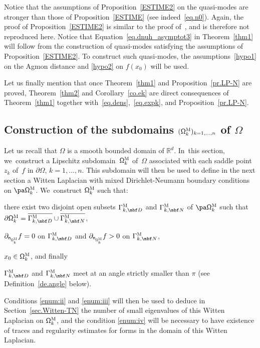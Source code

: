 Notice that the assumptions of Proposition~\ref{ESTIME2} on the
quasi-modes are stronger than those of Proposition~\ref{ESTIME} (see indeed~\eqref{eq.n0}).
Again, the proof of Proposition~\ref{ESTIME2} is similar to the proof
of~\cite[Prop.\,25]{DLLN}, and is therefore not reproduced
here. Notice that Equation~\eqref{eq.dnuh_asymptot3} in
Theorem~\ref{thm1} will follow from the construction of quasi-modes
satisfying the assumptions of Proposition~\ref{ESTIME2}. To construct such quasi-modes, the assumptions~\eqref{hypo1} on the Agmon distance and \eqref{hypo2} on $f(x_0)$ will be used.

Let us finally mention that once Theorem~\ref{thm1} and Proposition~\ref{pr.LP-N} are proved, Theorem~\ref{thm2} and Corollary~\ref{co.ek} are direct consequences of Theorem~\ref{thm1} together with~\eqref{eq.dens},~\eqref{eq.expk}, and Proposition~\ref{pr.LP-N}.

\subsection{Construction of the subdomains $(\mathsf
\Omega_k^{\textsc{M}})_{k=1,\ldots,n}$ of $\Omega$}\label{sec:omegakM}
Let us recall that $\Omega$ is a smooth bounded domain of $\mathbb R^d$. In~this section, we~construct a Lipschitz subdomain~$\mathsf \Omega_k^{\textsc{M}}$ of~$\Omega$ associated with each saddle point $z_k$ of~$f$ in $\partial \Omega$, $k=1,\ldots,n$. This subdomain will then be used to define in the next section a Witten Laplacian
with mixed Dirichlet-Neumann boundary
conditions on $\pa \mathsf \Omega_k^{\textsc{M}}$. We~construct
$\mathsf \Omega_k^{\textsc{M}}$ such that:
\begin{enumeratei}
\item\label{enum:i}
there exist
two disjoint open subsets $\Gamma_{k,\mbf D}^{\textsc{M}}$ and $\Gamma_{k,\mbf N}^{\textsc{M}}$ of $\pa \mathsf \Omega_k^{\textsc{M}}$ such that $\partial \mathsf
\Omega_k^{\textsc{M}} = \overline{\Gamma_{k,\mbf D}^{\textsc{M}}} \cup
\overline{\Gamma_{k,\mbf N}^{\textsc{M}}}$,

\item\label{enum:ii}
$\partial_{\mathsf n_{ \mathsf
\Omega_k^{\textsc{M}} } }f=0$ on $\Gamma_{k,\mbf D}^{\textsc{M}}$
and $\partial_{\mathsf n_{ \mathsf \Omega_k^{\textsc{M}} } }f>0$ on
$\Gamma_{k,\mbf N}^{\textsc{M}}$,

\item\label{enum:iii}
$x_0\in \mathsf
\Omega_k^{\textsc{M}}$, and finally 

\item\label{enum:iv}
$\Gamma_{k,\mbf D}^{\textsc{M}}$ and $\Gamma_{k,\mbf N}^{\textsc{M}}$ meet at an angle strictly smaller than $\pi$ (see Definition~\ref{de.angle} below). 
\end{enumeratei}
Conditions \eqref{enum:ii} and \eqref{enum:iii} will then be used to deduce in Section~\ref{sec.Witten-TN} the number of small eigenvalues of this Witten Laplacian on $\mathsf \Omega_k^{\textsc{M}}$, and the condition \eqref{enum:iv} will be necessary to have existence of traces and regularity estimates for forms in the domain of this Witten Laplacian.

